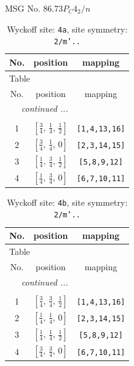 \documentclass[fleqn,8pt]{jsarticle}
\begin{document}
\setcounter{MaxMatrixCols}{32}

\renewcommand{\tablename}{Table~}
\renewcommand{\figurename}{Figure~}
\begin{center}
\LARGE
MSG No. 86.73\quad$P_{C}4_{2}/n$
\end{center}
\renewcommand{\arraystretch}{1.2}
\begin{longtable}{ccc}
\caption{Wyckoff site: {\tt 4a}, site symmetry: {\tt 2/m'..}}
 \\
 \hline \hline
No. & position & mapping \\ \hline \endfirsthead

\multicolumn{2}{l}{\tablename\ \thetable{}} \\
 \hline \hline
No. & position & mapping \\ \hline \endhead

 \hline \hline
\multicolumn{2}{r}{\footnotesize\it continued ...} \\ \endfoot

 \hline \hline
\multicolumn{2}{r}{} \\ \endlastfoot

1 & $\left[ \frac{3}{4},\, \frac{1}{4},\, \frac{1}{2} \right]$ & {\tt [1,4,13,16]} \\ \hline
2 & $\left[ \frac{3}{4},\, \frac{1}{4},\, 0 \right]$ & {\tt [2,3,14,15]} \\ \hline
3 & $\left[ \frac{1}{4},\, \frac{3}{4},\, \frac{1}{2} \right]$ & {\tt [5,8,9,12]} \\ \hline
4 & $\left[ \frac{1}{4},\, \frac{3}{4},\, 0 \right]$ & {\tt [6,7,10,11]} \\
\end{longtable}
\renewcommand{\arraystretch}{1.2}
\begin{longtable}{ccc}
\caption{Wyckoff site: {\tt 4b}, site symmetry: {\tt 2/m'..}}
 \\
 \hline \hline
No. & position & mapping \\ \hline \endfirsthead

\multicolumn{2}{l}{\tablename\ \thetable{}} \\
 \hline \hline
No. & position & mapping \\ \hline \endhead

 \hline \hline
\multicolumn{2}{r}{\footnotesize\it continued ...} \\ \endfoot

 \hline \hline
\multicolumn{2}{r}{} \\ \endlastfoot

1 & $\left[ \frac{3}{4},\, \frac{3}{4},\, \frac{1}{2} \right]$ & {\tt [1,4,13,16]} \\ \hline
2 & $\left[ \frac{1}{4},\, \frac{1}{4},\, 0 \right]$ & {\tt [2,3,14,15]} \\ \hline
3 & $\left[ \frac{1}{4},\, \frac{1}{4},\, \frac{1}{2} \right]$ & {\tt [5,8,9,12]} \\ \hline
4 & $\left[ \frac{3}{4},\, \frac{3}{4},\, 0 \right]$ & {\tt [6,7,10,11]} \\
\end{longtable}
\end{document}
